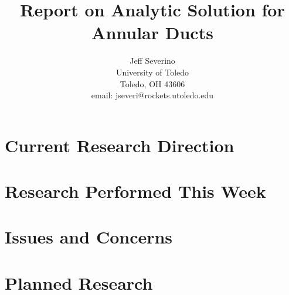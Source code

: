 \documentclass[12pt]{article}
\begin{document}
\begin{titlepage}
\title{
Report on Analytic Solution for Annular Ducts}


\author{ Jeff Severino
 \\
University of Toledo \\
Toledo, OH  43606 \\
email: jseveri@rockets.utoledo.edu  }

\maketitle

\end{titlepage}

\section{Current Research Direction}
\section{Research Performed This Week}
\section{Issues and Concerns}
\section{Planned Research}
\end{document}
